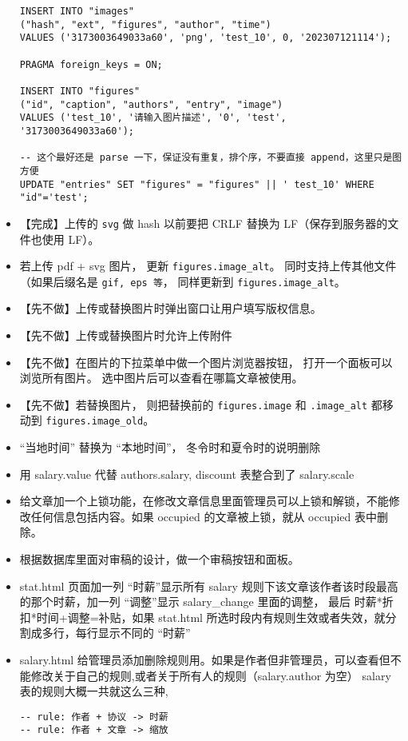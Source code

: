 \begin{itemize}
\begin{lstlisting}[language=none]
INSERT INTO "images"
("hash", "ext", "figures", "author", "time")
VALUES ('3173003649033a60', 'png', 'test_10', 0, '202307121114');

PRAGMA foreign_keys = ON;

INSERT INTO "figures"
("id", "caption", "authors", "entry", "image")
VALUES ('test_10', '请输入图片描述', '0', 'test', '3173003649033a60');

-- 这个最好还是 parse 一下，保证没有重复，排个序，不要直接 append，这里只是图方便
UPDATE "entries" SET "figures" = "figures" || ' test_10' WHERE "id"='test';
\end{lstlisting}
\item 【完成】上传的 \verb`svg` 做 hash 以前要把 CRLF 替换为 LF（保存到服务器的文件也使用 LF）。
\item 若上传 pdf + svg 图片， 更新 \verb`figures.image_alt`。 同时支持上传其他文件（如果后缀名是 \verb`gif, eps 等`， 同样更新到 \verb`figures.image_alt`。
\item 【先不做】上传或替换图片时弹出窗口让用户填写版权信息。
\item 【先不做】上传或替换图片时允许上传附件
\item 【先不做】在图片的下拉菜单中做一个图片浏览器按钮， 打开一个面板可以浏览所有图片。 选中图片后可以查看在哪篇文章被使用。
\item 【先不做】若替换图片， 则把替换前的 \verb`figures.image` 和 \verb`.image_alt` 都移动到 \verb`figures.image_old`。
\item “当地时间” 替换为 “本地时间”， 冬令时和夏令时的说明删除
\item 用 salary.value 代替 authors.salary,  discount 表整合到了 salary.scale
\item 给文章加一个上锁功能，在修改文章信息里面管理员可以上锁和解锁，不能修改任何信息包括内容。如果 occupied 的文章被上锁，就从 occupied 表中删除。
\item 根据数据库里面对审稿的设计，做一个审稿按钮和面板。
\item stat.html 页面加一列 “时薪”显示所有 salary 规则下该文章该作者该时段最高的那个时薪，加一列 “调整”显示 salary_change 里面的调整， 最后 时薪*折扣*时间+调整=补贴，如果 stat.html 所选时段内有规则生效或者失效，就分割成多行，每行显示不同的 “时薪”
\item salary.html 给管理员添加删除规则用。如果是作者但非管理员，可以查看但不能修改关于自己的规则,或者关于所有人的规则（salary.author 为空）
salary 表的规则大概一共就这么三种,
\begin{lstlisting}[language=none]
-- rule: 作者 + 协议 -> 时薪
-- rule: 作者 + 文章 -> 缩放

\end{lstlisting}
\end{itemize}
